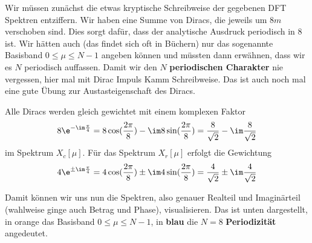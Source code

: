 \begin{ExCalc}
%
Wir müssen zunächst die etwas kryptische Schreibweise der gegebenen DFT
Spektren entziffern.
Wir haben eine Summe von Diracs, die jeweils um $8 m$ verschoben sind. Dies
sorgt dafür, dass der analytische Ausdruck periodisch in 8 ist. Wir hätten auch
(das findet sich oft in Büchern) nur das sogenannte Basisband $0\leq \mu \leq N-1$ angeben
können und müssten dann erwähnen, dass wir es $N$ periodisch auffassen.
%
Damit wir den $N$ \textbf{periodischen Charakter} nie vergessen, hier mal mit Dirac
Impuls Kamm Schreibweise. Das ist auch noch mal eine gute Übung zur
Austasteigenschaft des Diracs.

Alle Diracs werden gleich gewichtet mit einem komplexen Faktor
\begin{align}
8 \e^{-\im\frac{\pi}{4}}  = 8 \cos(\frac{2\pi}{8}) - \im 8 \sin(\frac{2\pi}{8})=
\frac{8}{\sqrt{2}} - \im \frac{8}{\sqrt{2}}
\end{align}
im Spektrum $X_c[\mu]$.
%
Für das Spektrum $X_r[\mu]$ erfolgt die Gewichtung
\begin{align}
4 \e^{\pm\im\frac{\pi}{4}}  = 4 \cos(\frac{2\pi}{8}) \pm \im 4 \sin(\frac{2\pi}{8})=
\frac{4}{\sqrt{2}} \pm \im \frac{4}{\sqrt{2}}
\end{align}

Damit können wir uns nun die Spektren, also genauer Realteil und Imaginärteil
(wahlweise ginge auch Betrag und Phase), visualisieren. Das ist unten dargestellt,
in orange das Basisband $0\leq \mu \leq N-1$, in \textbf{blau} die $N=8$
\textbf{Periodizität} angedeutet.


\end{ExCalc}
